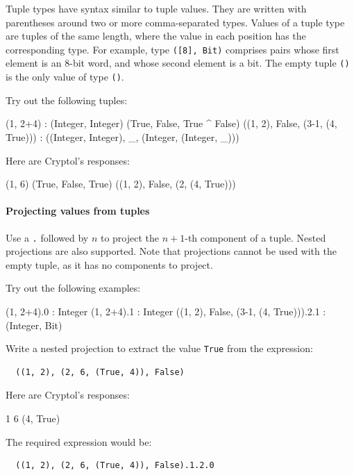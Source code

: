 Tuple types have syntax similar to tuple values. They are written with
parentheses around two or more comma-separated types. Values of a
tuple type are tuples of the same length, where the value in each
position has the corresponding type. For example, type \texttt{([8],
  Bit)} comprises pairs whose first element is an 8-bit word, and whose
second element is a bit. The empty tuple \texttt{()} is the only value
of type \texttt{()}.

\begin{Exercise}\label{ex:tup:1}
Try out the following tuples:
\restartrepl
\begin{replinVerb}
  (1, 2+4) : (Integer, Integer)
  (True, False, True ^ False)
  ((1, 2), False, (3-1, (4, True))) : ((Integer, Integer), _, (Integer, (Integer, _)))
\end{replinVerb}
\end{Exercise}
\begin{Answer}
Here are Cryptol's responses:
\begin{reploutVerb}
  (1, 6)
  (True, False, True)
  ((1, 2), False, (2, (4, True)))
\end{reploutVerb}
\end{Answer}


\paragraph*{Projecting values from tuples} Use a \texttt{.} followed by
$n$ to project the $n+1$-th component of a tuple. Nested projections
are also supported. Note that projections cannot be used with the
empty tuple, as it has no components to project.

\begin{Exercise}\label{ex:tup:2}
Try out the following examples:
\restartrepl
\begin{replinVerb}
  (1, 2+4).0 : Integer
  (1, 2+4).1 : Integer
  ((1, 2), False, (3-1, (4, True))).2.1 : (Integer, Bit)
\end{replinVerb}
Write a nested projection to extract the value \texttt{True} from the
expression:
\begin{Verbatim}
  ((1, 2), (2, 6, (True, 4)), False)
\end{Verbatim}
\end{Exercise}
\begin{Answer}
Here are Cryptol's responses:
\begin{reploutVerb}
  1
  6
  (4, True)
\end{reploutVerb}
The required expression would be:
\begin{Verbatim}
  ((1, 2), (2, 6, (True, 4)), False).1.2.0
\end{Verbatim}
\end{Answer}


